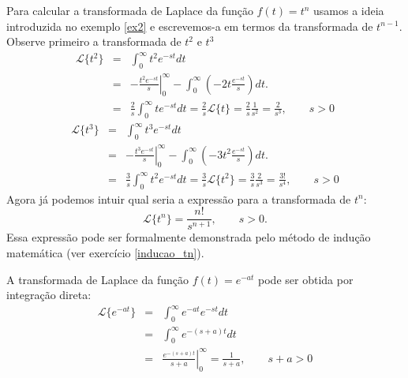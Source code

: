 \begin{ex} Para calcular a transformada de Laplace da função $f(t)=t^n$ usamos a ideia introduzida no exemplo \ref{ex2} e escrevemos-a em termos da transformada de $t^{n-1}$. Observe primeiro a transformada de $t^2$ e $t^3$
\begin{eqnarray*}
\mathcal{L}\{t^2\}&=&\int_0^\infty t^2e^{-st}dt\\
&=&\left.-\frac{t^2 e^{-st}}{s}\right|_0^\infty-\int_0^\infty \left(-2t\frac{e^{-st}}{s}\right)dt .\\
&=&\frac{2}{s}\int_0^\infty te^{-st}dt=\frac{2}{s}\mathcal{L}\{t\}=\frac{2}{s}\frac{1}{s^2}=\frac{2}{s^3},\qquad s>0
\end{eqnarray*}
\begin{eqnarray*}
\mathcal{L}\{t^3\}&=&\int_0^\infty t^3e^{-st}dt\\
&=&\left.-\frac{t^3 e^{-st}}{s}\right|_0^\infty-\int_0^\infty \left(-3t^2\frac{e^{-st}}{s}\right)dt .\\
&=&\frac{3}{s}\int_0^\infty t^2e^{-st}dt=\frac{3}{s}\mathcal{L}\{t^2\}=\frac{3}{s}\frac{2}{s^3}=\frac{3!}{s^4},\qquad s>0
\end{eqnarray*}
Agora já podemos intuir qual seria a expressão para a transformada de $t^n$:
$$
\mathcal{L}\{t^n\}=\frac{n!}{s^{n+1}},\qquad s>0.
$$
Essa expressão pode ser formalmente demonstrada pelo método de indução matemática (ver exercício \ref{inducao_tn}).
\end{ex}
\begin{ex}{\label{ex_trans_exp}}A transformada de Laplace da função $f(t)=e^{-at}$ pode ser obtida por integração direta:
\begin{eqnarray*}
\mathcal{L}\{e^{-at}\}&=&\int_0^\infty e^{-at}e^{-st}dt\\
&=&\int_0^\infty e^{-(s+a)t}dt\\
&=&\left.\frac{e^{-(s+a)t}}{s+a}\right|_0^\infty=\frac{1}{s+a},\qquad s+a>0
\end{eqnarray*}
\end{ex}
